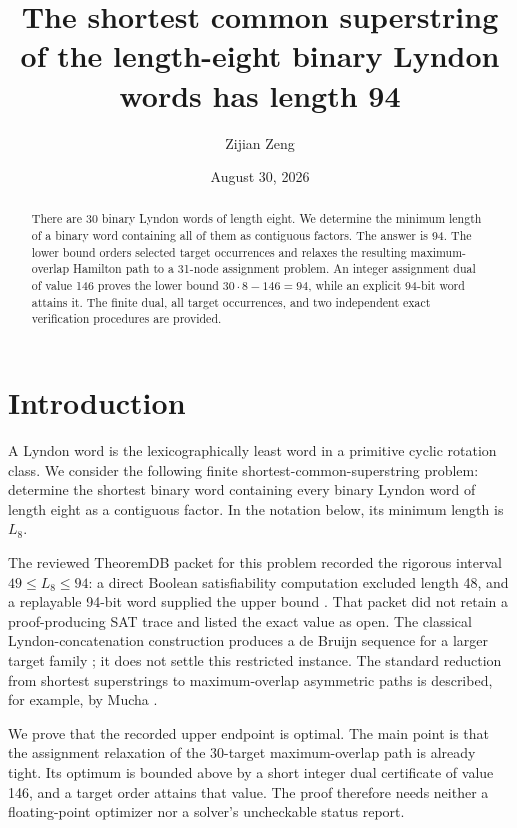 \documentclass[11pt]{amsart}
\title[Shortest superstring of length-eight Lyndon words]{The shortest common superstring of the length-eight binary Lyndon words has length 94}
\author{Zijian Zeng}
\date{August 30, 2026}
\theoremstyle{definition}
\begin{document}
\begin{abstract}
There are 30 binary Lyndon words of length eight.  We determine the minimum
length of a binary word containing all of them as contiguous factors.  The
answer is 94.  The lower bound orders selected target occurrences and relaxes
the resulting maximum-overlap Hamilton path to a 31-node assignment problem.
An integer assignment dual of value 146 proves the lower bound
$30\cdot8-146=94$, while an explicit 94-bit word attains it.  The finite dual,
all target occurrences, and two independent exact verification procedures are
provided.
\end{abstract}

\maketitle

\section{Introduction}

A Lyndon word is the lexicographically least word in a primitive cyclic
rotation class.  We consider the following finite shortest-common-superstring
problem: determine the shortest binary word containing every binary Lyndon
word of length eight as a contiguous factor.  In the notation below, its
minimum length is $L_8$.

The reviewed TheoremDB packet for this problem recorded the rigorous interval
$49\le L_8\le94$: a direct Boolean satisfiability computation excluded length
48, and a replayable 94-bit word supplied the upper bound
\cite{TheoremDBP2600}.  That packet did not retain a proof-producing SAT trace
and listed the exact value as open.  The classical Lyndon-concatenation
construction produces a de Bruijn sequence for a larger target family
\cite{FredricksenMaiorana1978}; it does not settle this restricted instance.
The standard reduction from shortest superstrings to maximum-overlap
asymmetric paths is described, for example, by Mucha
\cite{Mucha2013}.

We prove that the recorded upper endpoint is optimal.  The main point is that
the assignment relaxation of the 30-target maximum-overlap path is already
tight.  Its optimum is bounded above by a short integer dual certificate of
value 146, and a target order attains that value.  The proof therefore needs
neither a floating-point optimizer nor a solver's uncheckable status report.
\end{document}
